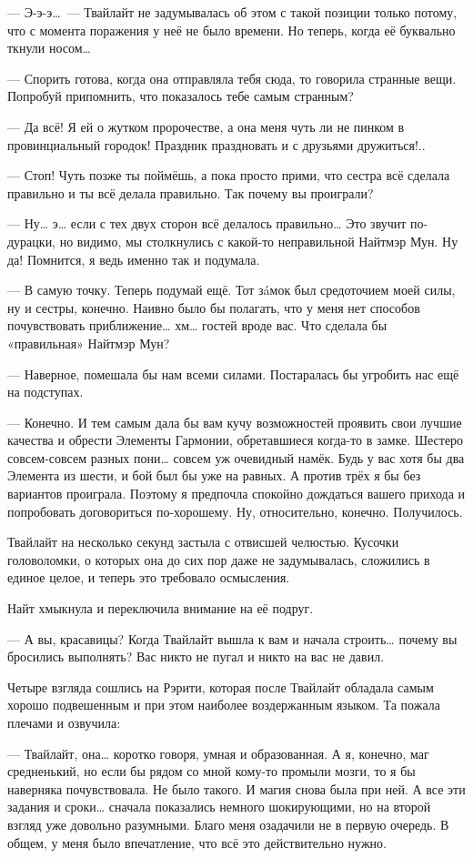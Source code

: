 \documentclass[twoside,a5paper,12pt]{extbook}
\begin{document}
 — Э-э-э… — Твайлайт не задумывалась об этом с такой позиции только потому, что с момента поражения у неё не было времени. Но теперь, когда её буквально ткнули носом…
 
 — Спорить готова, когда она отправляла тебя сюда, то говорила странные вещи. Попробуй припомнить, что показалось тебе самым странным?
 
 — Да всё! Я ей о жутком пророчестве, а она меня чуть ли не пинком в провинциальный городок! Праздник праздновать и с друзьями дружиться!..
 
 — Стоп! Чуть позже ты поймёшь, а пока просто прими, что сестра всё сделала правильно и ты всё делала правильно. Так почему вы проиграли?
 
 — Ну… э… если с тех двух сторон всё делалось правильно… Это звучит по-дурацки, но видимо, мы столкнулись с какой-то неправильной Найтмэр Мун. Ну да! Помнится, я ведь именно так и подумала.
 
 — В самую точку. Теперь подумай ещё. Тот зáмок был средоточием моей силы, ну и сестры, конечно. Наивно было бы полагать, что у меня нет способов почувствовать приближение… хм… гостей вроде вас. Что сделала бы «правильная» Найтмэр Мун?
 
 — Наверное, помешала бы нам всеми силами. Постаралась бы угробить нас ещё на подступах.
 
 — Конечно. И тем самым дала бы вам кучу возможностей проявить свои лучшие качества и обрести Элементы Гармонии, обретавшиеся когда-то в замке. Шестеро совсем-совсем разных пони… совсем уж очевидный намёк.  Будь у вас хотя бы два Элемента из шести, и бой был бы уже на равных. А против трёх я бы без вариантов проиграла. Поэтому я предпочла спокойно дождаться вашего прихода и попробовать договориться по-хорошему. Ну, относительно, конечно. Получилось.
 
 Твайлайт на несколько секунд застыла с отвисшей челюстью. Кусочки головоломки, о которых она до сих пор даже не задумывалась, сложились в единое целое, и теперь это требовало осмысления.
 
 Найт хмыкнула и переключила внимание на её подруг.
 
 — А вы, красавицы? Когда Твайлайт вышла к вам и начала строить… почему вы бросились выполнять? Вас никто не пугал и никто на вас не давил.
 
 Четыре взгляда сошлись на Рэрити, которая после Твайлайт обладала самым хорошо подвешенным и при этом наиболее воздержанным языком. Та пожала плечами и озвучила:
 
 — Твайлайт, она… коротко говоря, умная и образованная. А я, конечно, маг средненький, но если бы рядом со мной кому-то промыли мозги, то я бы наверняка почувствовала. Не было такого. И магия снова была при ней. А все эти задания и сроки… сначала показались немного шокирующими, но на второй взгляд уже довольно разумными. Благо меня озадачили не в первую очередь. В общем, у меня было впечатление, что всё это действительно нужно.
 
\end{document}

